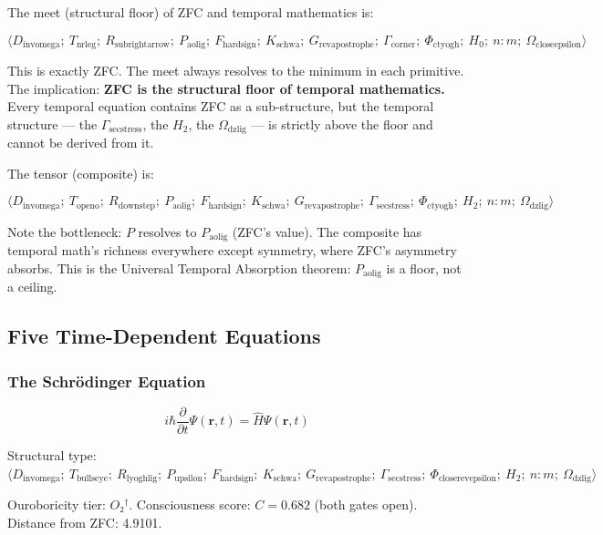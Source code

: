 \documentclass[12pt,a4paper]{article}
\begin{document}
The meet (structural floor) of ZFC and temporal mathematics is:

\[\langle D_{\text{invomega}};\ T_{\text{nrleg}};\ R_{\text{subrightarrow}};\ P_{\text{aolig}};\ F_{\text{hardsign}};\ K_{\text{schwa}};\ G_{\text{revapostrophe}};\ \Gamma_{\text{corner}};\ \Phi_{\text{ctyogh}};\ H_0;\ n{:}m;\ \Omega_{\text{closeepsilon}} \rangle\]

This is exactly ZFC. The meet always resolves to the minimum in each primitive. The implication: \textbf{ZFC is the structural floor of temporal mathematics.} Every temporal equation contains ZFC as a sub-structure, but the temporal structure --- the $\Gamma_{\text{secstress}}$, the $H_2$, the $\Omega_{\text{dzlig}}$ --- is strictly above the floor and cannot be derived from it.

The tensor (composite) is:

\[\langle D_{\text{invomega}};\ T_{\text{openo}};\ R_{\text{downstep}};\ P_{\text{aolig}};\ F_{\text{hardsign}};\ K_{\text{schwa}};\ G_{\text{revapostrophe}};\ \Gamma_{\text{secstress}};\ \Phi_{\text{ctyogh}};\ H_2;\ n{:}m;\ \Omega_{\text{dzlig}} \rangle\]

Note the bottleneck: $P$ resolves to $P_{\text{aolig}}$ (ZFC's value). The composite has temporal math's richness everywhere except symmetry, where ZFC's asymmetry absorbs. This is the Universal Temporal Absorption theorem: $P_{\text{aolig}}$ is a floor, not a ceiling.

\subsection{Five Time-Dependent Equations}

\subsubsection{The Schrödinger Equation}

\[i\hbar\frac{\partial}{\partial t}\Psi(\mathbf{r},t) = \hat{H}\Psi(\mathbf{r},t)\]

Structural type: $\langle D_{\text{invomega}};\ T_{\text{bullseye}};\ R_{\text{lyoghlig}};\ P_{\text{upsilon}};\ F_{\text{hardsign}};\ K_{\text{schwa}};\ G_{\text{revapostrophe}};\ \Gamma_{\text{secstress}};\ \Phi_{\text{closerevepsilon}};\ H_2;\ n{:}m;\ \Omega_{\text{dzlig}} \rangle$

Ouroboricity tier: $O₂^\dagger$. Consciousness score: $C = 0.682$ (both gates open). Distance from ZFC: 4.9101.
\end{document}
